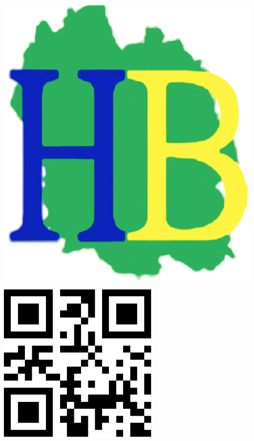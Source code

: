 \documentclass[a4paper,11pt,fleqn]{article}
\begin{document}
\Huge

\begin{block} %
{}\hfill {}
{}\hfill {}
\begin{minipage}{0.15\linewidth}
\includegraphics[width=\textwidth]{../media/logo-HB.png}
\end{minipage}
{}\hfill {}



\begin{minipage}{0.48\linewidth}
\includegraphics[width=8cm]{./1.pdf}


\end{minipage}
\end{block}
\end{document}
